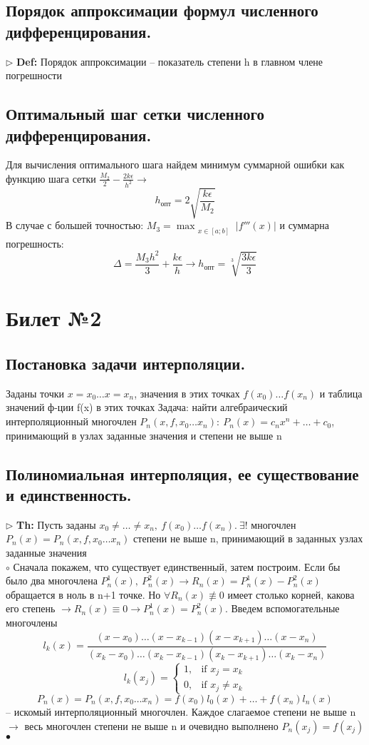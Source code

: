 \documentclass[a4paper]{article}
\begin{document}
\subsection{Порядок аппроксимации формул численного дифференцирования.}
$\triangleright$ \textbf{Def:} Порядок аппроксимации – показатель степени h в главном члене погрешности 
\subsection{Оптимальный шаг сетки численного дифференцирования.}
Для вычисления оптимального шага найдем минимум суммарной ошибки как функцию шага сетки $\frac{M_2}{2} - \frac{2k\epsilon}{h^2} \rightarrow$
$$ h_{опт}=2 \sqrt{\frac{k\epsilon}{M_2}} $$
В случае с большей точностью: $M_3=\max_{\substack{x \in [a;b]}} |f'''(x)|$ и суммарна погрешность:
$$ \Delta = \frac{M_3h^2}{3} + \frac{k\epsilon}{h} \rightarrow h_{опт}=\sqrt[3]{\frac{3k\epsilon}{3}}$$

\section{Билет №2}
\subsection{Постановка задачи интерполяции.}
Заданы точки $x=x_0 \ldots x=x_n$, значения в этих точках $f(x_0) \ldots f(x_n)$ и таблица значений ф-ции f(x) в этих точках
Задача: найти алгебраический интерполяционный многочлен $P_n(x,f,x_0 \ldots x_n): \ P_n(x) = c_nx^n + \ldots +c_0$, принимающий в узлах заданные значения и степени не выше n
\subsection{Полиномиальная интерполяция, ее существование и единственность.}
$\triangleright$ \textbf{Th:} Пусть заданы $x_0 \neq \ldots \neq x_n,\ f(x_0) \ldots f(x_n). \ \exists !$ многочлен $P_n(x) = P_n(x,f,x_0 \ldots x_n)$ степени не выше n, принимающий в заданных узлах заданные значения \\
	$\circ$ Сначала покажем, что существует единственный, затем построим.
	Если бы было два многочлена $P_n^1(x),\ P_n^2(x) \rightarrow R_n(x) = P_n^1(x)-P_n^2(x)$ обращается в ноль в n+1 точке. Но $\forall R_n(x) \not\equiv 0$ имеет столько корней, какова его степень $\rightarrow R_n(x) \equiv 0 \rightarrow P_n^1(x)=P_n^2(x)$.
	Введем вспомогательные многочлены $$l_k(x) = \frac{(x-x_0) \ldots (x-x_{k-1})(x-x_{k+1}) \ldots (x-x_n)}{(x_k-x_0) \ldots (x_k-x_{k-1})(x_k-x_{k+1}) \ldots (x_k-x_n)}$$ 
	$$l_k(x_j)=\begin{cases} 1,  & \mbox{if }x_j = x_k\\ 0, & \mbox{if }x_j \neq x_k \end{cases}$$
	$$P_n(x) = P_n(x,f,x_0 \ldots x_n) = f(x_0)l_0(x) + \ldots + f(x_n)l_n(x)$$ – искомый интерполяционный многочлен. Каждое слагаемое степени не выше n $\rightarrow$ весь многочлен степени не выше n и очевидно выполнено $P_n(x_j)=f(x_j)$
	$\bullet$
\end{document}
